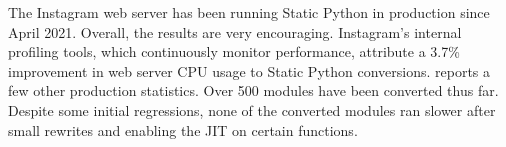 \documentclass[english,cleveref,submission]{programming}
\newcommand{\SP}{Static Python}
\newcommand{\CPUchange}{3.7\%}
\begin{document}



The Instagram web server has been running \SP{} in production since April 2021.
Overall, the results are very encouraging.
Instagram's internal profiling tools, which continuously monitor
performance, attribute a \CPUchange{} improvement in web server CPU usage to \SP{} conversions.
 reports a few other production statistics.
Over 500 modules have been converted thus far.
Despite some initial regressions, none of the converted modules
ran slower after small rewrites and enabling the JIT on certain functions.
\end{document}
